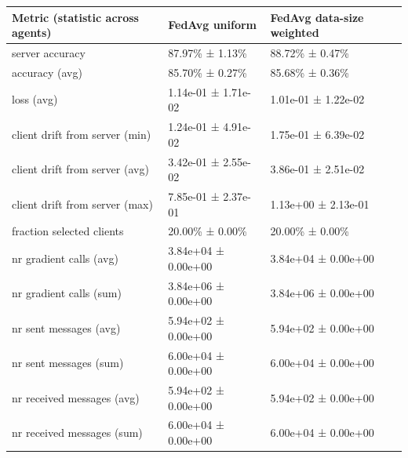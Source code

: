 \begin{tabular}{lll}
\hline
 Metric (statistic across agents)   & FedAvg uniform      & FedAvg data-size weighted   \\
\hline
 server accuracy                    & 87.97\% ± 1.13\%      & 88.72\% ± 0.47\%              \\
 accuracy (avg)                     & 85.70\% ± 0.27\%      & 85.68\% ± 0.36\%              \\
 loss (avg)                         & 1.14e-01 ± 1.71e-02 & 1.01e-01 ± 1.22e-02         \\
 client drift from server (min)     & 1.24e-01 ± 4.91e-02 & 1.75e-01 ± 6.39e-02         \\
 client drift from server (avg)     & 3.42e-01 ± 2.55e-02 & 3.86e-01 ± 2.51e-02         \\
 client drift from server (max)     & 7.85e-01 ± 2.37e-01 & 1.13e+00 ± 2.13e-01         \\
 fraction selected clients          & 20.00\% ± 0.00\%      & 20.00\% ± 0.00\%              \\
 nr gradient calls (avg)            & 3.84e+04 ± 0.00e+00 & 3.84e+04 ± 0.00e+00         \\
 nr gradient calls (sum)            & 3.84e+06 ± 0.00e+00 & 3.84e+06 ± 0.00e+00         \\
 nr sent messages (avg)             & 5.94e+02 ± 0.00e+00 & 5.94e+02 ± 0.00e+00         \\
 nr sent messages (sum)             & 6.00e+04 ± 0.00e+00 & 6.00e+04 ± 0.00e+00         \\
 nr received messages (avg)         & 5.94e+02 ± 0.00e+00 & 5.94e+02 ± 0.00e+00         \\
 nr received messages (sum)         & 6.00e+04 ± 0.00e+00 & 6.00e+04 ± 0.00e+00         \\
\hline
\end{tabular}